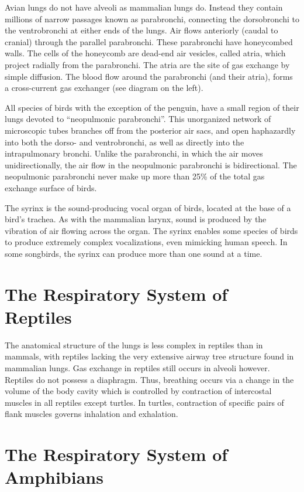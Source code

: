 Avian lungs do not have alveoli as mammalian lungs do. Instead they contain millions of narrow passages known as parabronchi, connecting the dorsobronchi to the ventrobronchi at either ends of the lungs. Air flows anteriorly (caudal to cranial) through the parallel parabronchi. These parabronchi have honeycombed walls. The cells of the honeycomb are dead-end air vesicles, called atria, which project radially from the parabronchi. The atria are the site of gas exchange by simple diffusion. The blood flow around the parabronchi (and their atria), forms a cross-current gas exchanger (see diagram on the left).

All species of birds with the exception of the penguin, have a small region of their lungs devoted to ``neopulmonic parabronchi''. This unorganized network of microscopic tubes branches off from the posterior air sacs, and open haphazardly into both the dorso- and ventrobronchi, as well as directly into the intrapulmonary bronchi. Unlike the parabronchi, in which the air moves unidirectionally, the air flow in the neopulmonic parabronchi is bidirectional. The neopulmonic parabronchi never make up more than 25\% of the total gas exchange surface of birds.

The syrinx is the sound-producing vocal organ of birds, located at the base of a bird's trachea. As with the mammalian larynx, sound is produced by the vibration of air flowing across the organ. The syrinx enables some species of birds to produce extremely complex vocalizations, even mimicking human speech. In some songbirds, the syrinx can produce more than one sound at a time.

\hypertarget{the-respiratory-system-of-reptiles}{%
\section{The Respiratory System of Reptiles}\label{the-respiratory-system-of-reptiles}}

The anatomical structure of the lungs is less complex in reptiles than in mammals, with reptiles lacking the very extensive airway tree structure found in mammalian lungs. Gas exchange in reptiles still occurs in alveoli however. Reptiles do not possess a diaphragm. Thus, breathing occurs via a change in the volume of the body cavity which is controlled by contraction of intercostal muscles in all reptiles except turtles. In turtles, contraction of specific pairs of flank muscles governs inhalation and exhalation.

\hypertarget{the-respiratory-system-of-amphibians}{%
\section{The Respiratory System of Amphibians}\label{the-respiratory-system-of-amphibians}}

